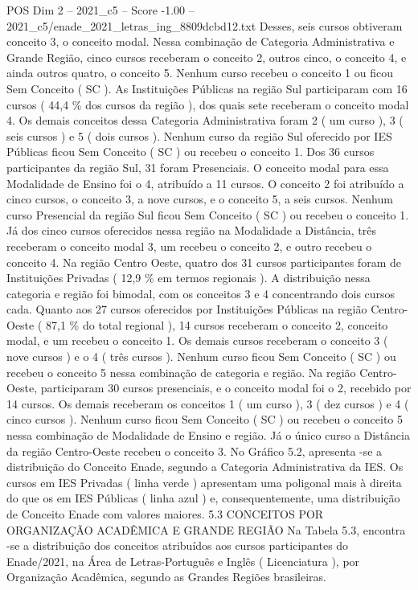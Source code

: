 \begin{textsample}{POS Dim 2 – 2021\_c5 – Score -1.00 – 2021\_c5/enade\_2021\_letras\_ing\_8809dcbd12.txt}
Desses, seis cursos obtiveram conceito 3, o conceito modal.
Nessa combinação de Categoria Administrativa e Grande Região, cinco cursos receberam o conceito 2, outros cinco, o conceito 4, e ainda outros quatro, o conceito 5.
Nenhum curso recebeu o conceito 1 ou ficou Sem Conceito ( SC ).
As Instituições Públicas na região Sul participaram com 16 cursos ( 44,4 \% dos cursos da região ), dos quais sete receberam o conceito modal 4.
Os demais conceitos dessa Categoria Administrativa foram 2 ( um curso ), 3 ( seis cursos ) e 5 ( dois cursos ).
Nenhum curso da região Sul oferecido por IES Públicas ficou Sem Conceito ( SC ) ou recebeu o conceito 1.
Dos 36 cursos participantes da região Sul, 31 foram Presenciais.
O conceito modal para essa Modalidade de Ensino foi o 4, atribuído a 11 cursos.
O conceito 2 foi atribuído a cinco cursos, o conceito 3, a nove cursos, e o conceito 5, a seis cursos.
Nenhum curso Presencial da região Sul ficou Sem Conceito ( SC ) ou recebeu o conceito 1.
Já dos cinco cursos oferecidos nessa região na Modalidade a Distância, três receberam o conceito modal 3, um recebeu o conceito 2, e outro recebeu o conceito 4.
Na região Centro Oeste, quatro dos 31 cursos participantes foram de Instituições Privadas ( 12,9 \% em termos regionais ).
A distribuição nessa categoria e região foi bimodal, com os conceitos 3 e 4 concentrando dois cursos cada.
Quanto aos 27 cursos oferecidos por Instituições Públicas na região Centro-Oeste ( 87,1 \% do total regional ), 14 cursos receberam o conceito 2, conceito modal, e um recebeu o conceito 1.
Os demais cursos receberam o conceito 3 ( nove cursos ) e o 4 ( três cursos ).
Nenhum curso ficou Sem Conceito ( SC ) ou recebeu o conceito 5 nessa combinação de categoria e região.
Na região Centro-Oeste, participaram 30 cursos presenciais, e o conceito modal foi o 2, recebido por 14 cursos.
Os demais receberam os conceitos 1 ( um curso ), 3 ( dez cursos ) e 4 ( cinco cursos ).
Nenhum curso ficou Sem Conceito ( SC ) ou recebeu o conceito 5 nessa combinação de Modalidade de Ensino e região.
Já o único curso a Distância da região Centro-Oeste recebeu o conceito 3.
No Gráfico 5.2, apresenta -se a distribuição do Conceito Enade, segundo a Categoria Administrativa da IES.
Os cursos em IES Privadas ( linha verde ) apresentam uma poligonal mais à direita do que os em IES Públicas ( linha azul ) e, consequentemente, uma distribuição de Conceito Enade com valores maiores. 5.3 CONCEITOS POR ORGANIZAÇÃO ACADÊMICA E GRANDE REGIÃO Na Tabela 5.3, encontra -se a distribuição dos conceitos atribuídos aos cursos participantes do Enade/2021, na Área de Letras-Português e Inglês ( Licenciatura ), por Organização Acadêmica, segundo as Grandes Regiões brasileiras.

\end{textsample}

